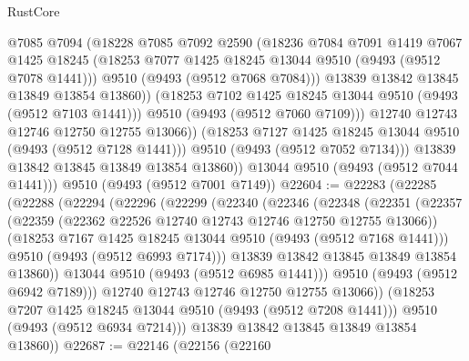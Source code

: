 \begin{lexlean}{RustCore}
\begin{coremodule}
                    @7085
                    @7094
                    (@18228
                      @7085
                      @7092
                      @2590
                      (@18236
                        @7084
                        @7091
                        @1419
                        @7067
                        @1425
                        @18245
                        (@18253 @7077 @1425 @18245 @13044 @9510 (@9493 (@9512 @7078 @1441)))
                        @9510
                        (@9493 (@9512 @7068 @7084)))
                      @13839
                      @13842
                      @13845
                      @13849
                      @13854
                      @13860))
                  (@18253 @7102 @1425 @18245 @13044 @9510 (@9493 (@9512 @7103 @1441)))
                  @9510
                  (@9493 (@9512 @7060 @7109)))
                @12740
                @12743
                @12746
                @12750
                @12755
                @13066))
            (@18253 @7127 @1425 @18245 @13044 @9510 (@9493 (@9512 @7128 @1441)))
            @9510
            (@9493 (@9512 @7052 @7134)))
          @13839
          @13842
          @13845
          @13849
          @13854
          @13860))
      @13044
      @9510
      (@9493 (@9512 @7044 @1441)))
    @9510
    (@9493 (@9512 @7001 @7149))
@22604 := @22283
    (@22285
      (@22288
        (@22294
          (@22296
            (@22299
              (@22340
                (@22346
                  (@22348
                    (@22351
                      (@22357
                        (@22359 (@22362 @22526 @12740 @12743 @12746 @12750 @12755 @13066))
                        (@18253 @7167 @1425 @18245 @13044 @9510 (@9493 (@9512 @7168 @1441)))
                        @9510
                        (@9493 (@9512 @6993 @7174)))
                      @13839
                      @13842
                      @13845
                      @13849
                      @13854
                      @13860))
                  @13044
                  @9510
                  (@9493 (@9512 @6985 @1441)))
                @9510
                (@9493 (@9512 @6942 @7189)))
              @12740
              @12743
              @12746
              @12750
              @12755
              @13066))
          (@18253 @7207 @1425 @18245 @13044 @9510 (@9493 (@9512 @7208 @1441)))
          @9510
          (@9493 (@9512 @6934 @7214)))
        @13839
        @13842
        @13845
        @13849
        @13854
        @13860))
@22687 := @22146
    (@22156
      (@22160

\end{coremodule}
\end{lexlean}
